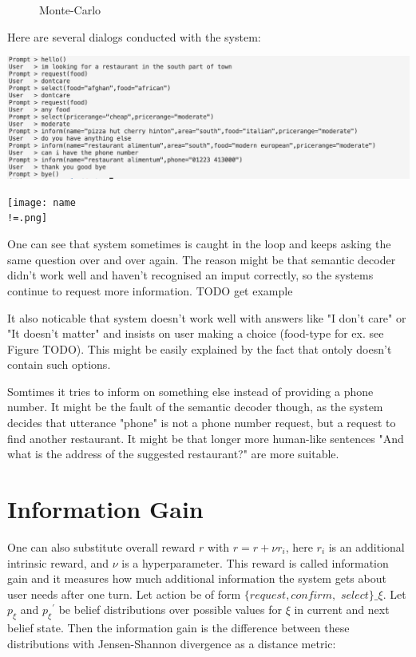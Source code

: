 \documentclass[12pt,titlepage,a4paper]{article}
\begin{document}
\begin{figure}[!htb]
      \caption{Monte-Carlo}
    \endminipage
\end{figure}

Here are several dialogs conducted with the system: 

\begin{center}
    \includegraphics[width=\linewidth]{wants_food_type.png}
\end{center}

\begin{center}
    \texttt{[image: name\\ !=.png]}
\end{center}

One can see that system sometimes is caught in the loop and keeps asking the same question over and over again. The reason might be that semantic decoder didn't work well and haven't recognised an imput correctly, so the systems continue to request more information. TODO get example

It also noticable that system doesn't work well with answers like "I don't care" or "It doesn't matter" and insists on user making a choice (food-type for ex. see Figure TODO). This might be easily explained by the fact that ontoly doesn't contain such options.

Somtimes it tries to inform on something else instead of providing a phone number. It might be the fault of the semantic decoder though, as the system decides that utterance "phone" is not a phone number request, but a request to find another restaurant. It might be that longer more human-like sentences "And what is the address of the suggested restaurant?" are more suitable.

\section{Information Gain}

One can also substitute overall reward $r$ with $r = r + \nu r_i$, here $r_i$ is an additional intrinsic reward, and $\nu$ is a hyperparameter. This reward is called information gain and it measures how much additional information the system gets about user needs after one turn. Let action be of form $\{request, confirm,$ $select\}\_\xi$. Let $p_{\xi}$ and ${p_{\xi}}^\prime$ be belief distributions over possible values for $\xi$ in current and next belief state. Then the informa\-tion gain is the difference between these distributions with Jensen-Shannon divergence as a distance metric:
\end{document}
